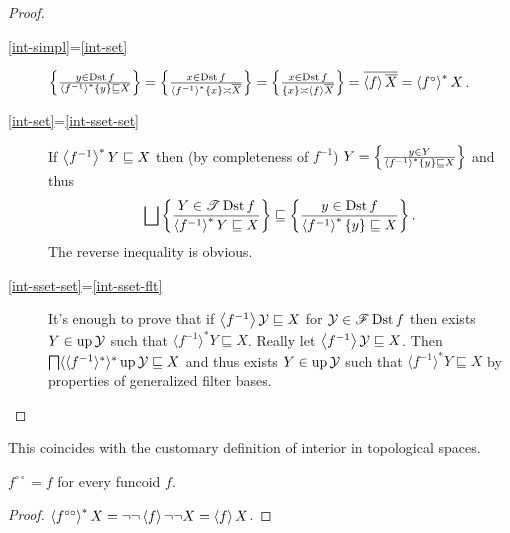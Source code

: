 \begin{proof}
  ~
  \begin{description}
    \item[\ref{int-simpl}=\ref{int-set}] $\left\{ \frac{ y \in \operatorname{Dst} f }{
    \left\langle f^{- 1}\right\rangle ^{\ast} \{ y \} \sqsubseteq X }\right\} = \left\{ \frac{ x \in
    \operatorname{Dst} f }{ \left\langle f^{- 1}\right\rangle ^{\ast} \{
    x \} \asymp \overline{X} }\right\} = \left\{ \frac{ x \in \operatorname{Dst} f
    }{ \{ x \} \asymp \left\langle f\right\rangle
    \overline{X} }\right\} = \overline{\left\langle f\right\rangle \overline{X}} =
    \left\langle f^{\circ}\right\rangle ^{\ast} X$.
    
    \item[\ref{int-set}=\ref{int-sset-set}] If $\left\langle f^{- 1}\right\rangle ^{\ast} Y \sqsubseteq X$ then (by
    completeness of $f^{- 1}$) $Y = \left\{ \frac{ y \in Y }{
    \left\langle f^{- 1}\right\rangle ^{\ast} \{ y \} \sqsubseteq X }\right\}$ and thus
    \[ \bigsqcup \setcond{ Y \in \mathscr{T} \Dst f }
       { \rsupfun{f^{- 1}} Y \sqsubseteq X }
       \sqsubseteq \setcond{ y \in \Dst f }{
       \rsupfun{f^{- 1}} \{ y \} \sqsubseteq X } . \]
    The reverse inequality is obvious.
    
    \item[\ref{int-sset-set}=\ref{int-sset-flt}] It's enough to prove that if $\left\langle f^{- 1}\right\rangle
    \mathcal{Y} \sqsubseteq X$ for $\mathcal{Y} \in \mathscr{F} \operatorname{Dst} f$
    then exists $Y \in \operatorname{up} \mathcal{Y}$ such that $\langle f^{- 1}
    \rangle^{\ast} Y \sqsubseteq X$. Really let $\left\langle f^{- 1}\right\rangle
    \mathcal{Y} \sqsubseteq X$. Then $\bigsqcap \langle \langle f^{- 1}
    \rangle^{\ast} \rangle^{\ast} \operatorname{up} \mathcal{Y} \sqsubseteq X$ and
    thus exists $Y \in \operatorname{up} \mathcal{Y}$ such that $\langle f^{- 1}
    \rangle^{\ast} Y \sqsubseteq X$ by properties of generalized filter bases.
  \end{description}
\end{proof}

This coincides with the customary definition of interior in topological
spaces.

\begin{prop}
  $f^{\circ \circ} = f$ for every funcoid $f$.
\end{prop}

\begin{proof}
  $\left\langle f^{\circ\circ}\right\rangle ^{\ast} X = \neg \neg \left\langle f\right\rangle
  \neg \neg X = \left\langle f\right\rangle X$.
\end{proof}